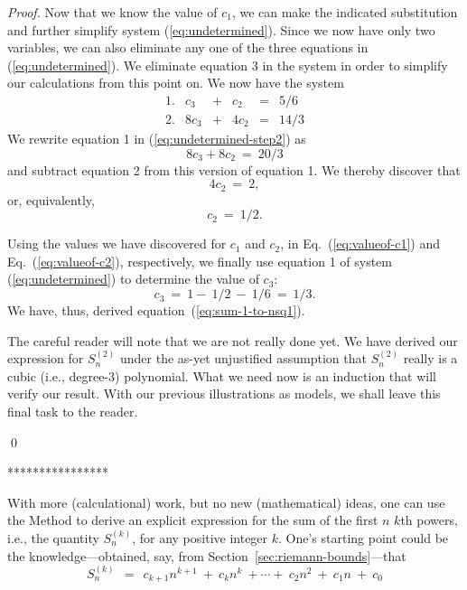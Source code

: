 {\begin{proof}
Now that we know the value of $c_1$, we can make the indicated substitution and further simplify system (\ref{eq:undetermined}).  Since we now have only two variables, we can also eliminate any one of the three equations in (\ref{eq:undetermined}).  We eliminate equation 3 in the system in order to simplify our calculations from this point on.  We now have the system
\begin{equation}
\label{eq:undetermined-step2}
\begin{array}{lccccc}
1. &
c_3  & + & c_2   & = & 5/6 \\
2. &
8c_3 & + & 4 c_2 & = & 14/3 
\end{array}
\end{equation}
We rewrite equation 1 in (\ref{eq:undetermined-step2}) as
\[ 8 c_3 + 8 c_2 \ = \ 20/3 \]
and subtract equation 2 from this version of equation 1.  We thereby discover that
\[ 4 c_2 \ = \ 2, \]
or, equivalently,
\begin{equation}
\label{eq:valueof-c2}
c_2 \ = \ 1/2.
\end{equation}

Using the values we have discovered for $c_1$ and $c_2$, in Eq.~(\ref{eq:valueof-c1}) and Eq.~(\ref{eq:valueof-c2}), respectively, we finally use equation 1 of system (\ref{eq:undetermined}) to determine the value of $c_3$:
\begin{equation}
\label{eq:valueof-c3}
c_3 \ = \ 1 - \ 1/2 \ - \ 1/6 \ = \ 1/3.
\end{equation}
We have, thus, derived equation~(\ref{eq:sum-1-to-nsq1}).

\medskip

The careful reader will note that we are not really done yet.  We have derived our expression for $S^{(2)}_n$ under the as-yet unjustified assumption that $S^{(2)}_n$ really is a cubic (i.e.,
degree-$3$) polynomial.  What we need now is an induction that will
verify our result.  With our previous illustrations as models, we
shall leave this final task to the reader.

\qed
\end{proof}
****************}

\bigskip

With more (calculational) work, but no new (mathematical) ideas, one can use the Method to derive an explicit expression for the sum of the first $n$ $k$th powers, i.e., the quantity $S^{(k)}_n$, for any positive integer $k$.   One's starting point could be the knowledge---obtained, say, from Section~\ref{sec:riemann-bounds}---that
\[ S^{(k)}_n \ \ = \ \ c_{k+1} n^{k+1} \ + \ c_k n^{k} \ +  \cdots + \ c_2 n^2 \ + \ c_1 n \ + \ c_0 \]


